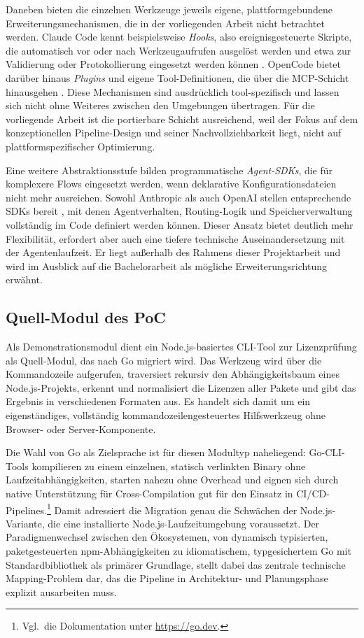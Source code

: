 Daneben bieten die einzelnen Werkzeuge jeweils eigene, plattformgebundene Erweiterungsmechanismen, die in der vorliegenden Arbeit nicht betrachtet werden. Claude Code kennt beispielsweise \emph{Hooks}, also ereignisgesteuerte Skripte, die automatisch vor oder nach Werkzeugaufrufen ausgelöst werden und etwa zur Validierung oder Protokollierung eingesetzt werden können \parencite{claudecodedocs}. OpenCode bietet darüber hinaus \emph{Plugins} und eigene Tool-Definitionen, die über die MCP-Schicht hinausgehen \parencite{opencodetool}. Diese Mechanismen sind ausdrücklich tool-spezifisch und lassen sich nicht ohne Weiteres zwischen den Umgebungen übertragen. Für die vorliegende Arbeit ist die portierbare Schicht ausreichend, weil der Fokus auf dem konzeptionellen Pipeline-Design und seiner Nachvollziehbarkeit liegt, nicht auf plattformspezifischer Optimierung.

Eine weitere Abstraktionsstufe bilden programmatische \emph{Agent-SDKs}, die für komplexere Flows eingesetzt werden, wenn deklarative Konfigurationsdateien nicht mehr ausreichen. Sowohl Anthropic als auch OpenAI stellen entsprechende SDKs bereit \parencite{anthropicagentsdk,openaiagenssdk}, mit denen Agentverhalten, Routing-Logik und Speicherverwaltung vollständig im Code definiert werden können. Dieser Ansatz bietet deutlich mehr Flexibilität, erfordert aber auch eine tiefere technische Auseinandersetzung mit der Agentenlaufzeit. Er liegt außerhalb des Rahmens dieser Projektarbeit und wird im Ausblick auf die Bachelorarbeit als mögliche Erweiterungsrichtung erwähnt.

\subsection{Quell-Modul des PoC}

Als Demonstrationsmodul dient ein Node.js-basiertes CLI-Tool zur Lizenzprüfung als Quell-Modul, das nach Go migriert wird. Das Werkzeug wird über die Kommandozeile aufgerufen, traversiert rekursiv den Abhängigkeitsbaum eines Node.js-Projekts, erkennt und normalisiert die Lizenzen aller Pakete und gibt das Ergebnis in verschiedenen Formaten aus. Es handelt sich damit um ein eigenständiges, vollständig kommandozeilengesteuertes Hilfswerkzeug ohne Browser- oder Server-Komponente.

Die Wahl von Go als Zielsprache ist für diesen Modultyp naheliegend: Go-CLI-Tools kompilieren zu einem einzelnen, statisch verlinkten Binary ohne Laufzeitabhängigkeiten, starten nahezu ohne Overhead und eignen sich durch native Unterstützung für Cross-Compilation gut für den Einsatz in CI/CD-Pipelines.\footnote{Vgl.\ die Dokumentation unter \url{https://go.dev}.} Damit adressiert die Migration genau die Schwächen der Node.js-Variante, die eine installierte Node.js-Laufzeitumgebung voraussetzt. Der Paradigmenwechsel zwischen den Ökosystemen, von dynamisch typisierten, paketgesteuerten npm-Abhängigkeiten zu idiomatischem, typgesichertem Go mit Standardbibliothek als primärer Grundlage, stellt dabei das zentrale technische Mapping-Problem dar, das die Pipeline in Architektur- und Planungsphase explizit ausarbeiten muss.

